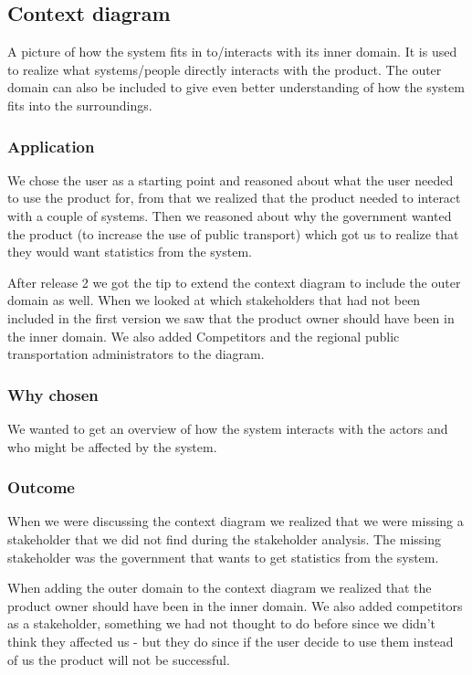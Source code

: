 \documentclass[a4paper]{article}
\begin{document}
		\subsection{Context diagram} \label{subsec:context}
		A picture of how the system fits in to/interacts with its inner domain. It is used to realize what systems/people directly interacts with the product. The outer domain can also be included to give even better understanding of how the system fits into the surroundings.
			\subsubsection{Application}
			We chose the user as a starting point and reasoned about what the user needed to use the product for, from that we realized that the product needed to interact with a couple of systems. Then we reasoned about why the government wanted the product (to increase the use of public transport) which got us to realize that they would want statistics from the system.
			
			After release 2 we got the tip to extend the context diagram to include the outer domain as well. When we looked at which stakeholders that had not been included in the first version we saw that the product owner should have been in the inner domain. We also added Competitors and the regional public transportation administrators to the diagram.
			
			\subsubsection{Why chosen}
			We wanted to get an overview of how the system interacts with the actors and who might be affected by the system.
			\subsubsection{Outcome}
			When we were discussing the context diagram we realized that we were missing a stakeholder that we did not find during the stakeholder analysis. The missing stakeholder was the government that wants to get statistics from the system. 
			
			When adding the outer domain to the context diagram we realized that the product owner should have been in the inner domain. We also added competitors as a stakeholder, something we had not thought to do before since we didn't think they affected us - but they do since if the user decide to use them instead of us the product will not be successful.
\end{document}
